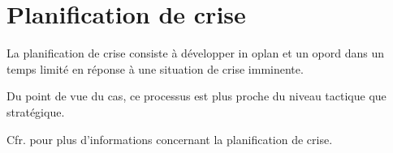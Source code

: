 \section{Planification de crise}

La planification de crise consiste à développer in \gls{oplan} et un \gls{opord} dans un temps limité en réponse à une situation de crise imminente.

Du point de vue du \gls{cas}, ce processus est plus proche du niveau tactique que stratégique.

Cfr.  pour plus d'informations concernant la planification de crise.
